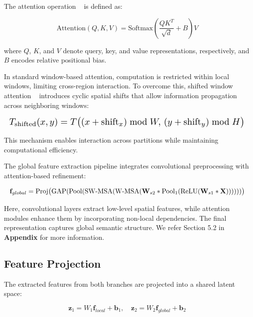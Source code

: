\documentclass[preprint,12pt]{elsarticle}
\begin{document}
The attention operation ~\cite{b4} is defined as:

\begin{equation*}
\text{Attention}(Q,K,V)
=
\text{Softmax}\left(\frac{QK^T}{\sqrt{d}} + B\right)V
\end{equation*}

where $Q$, $K$, and $V$ denote query, key, and value representations, respectively, and $B$ encodes relative positional bias.

In standard window-based attention, computation is restricted within local windows, limiting cross-region interaction. To overcome this, shifted window attention ~\cite{b5} introduces cyclic spatial shifts that allow information propagation across neighboring windows:

\begin{equation*}
\resizebox{\columnwidth}{!}{$
T_{\text{shifted}}(x,y)
=
T\big((x+\text{shift}_x)\bmod W,\,(y+\text{shift}_y)\bmod H\big)
$}
\end{equation*}

This mechanism enables interaction across partitions while maintaining computational efficiency.

The global feature extraction pipeline integrates convolutional preprocessing with attention-based refinement:

\begin{equation*}
\resizebox{\columnwidth}{!}{$
\mathbf{f}_{global}
=
\mathrm{Proj}\big(
\mathrm{GAP}(
\mathrm{Pool}(
\mathrm{SW\text{-}MSA}(
\mathrm{W\text{-}MSA}(
\mathbf{W}_{s2} *
\mathrm{Pool}_1(
\mathrm{ReLU}(\mathbf{W}_{s1} * \mathbf{X})
)
)
)
)
)
\big)
$}
\end{equation*}

Here, convolutional layers extract low-level spatial features, while attention modules enhance them by incorporating non-local dependencies. The final representation captures global semantic structure. We refer Section 5.2 in \textbf{Appendix} for more information.

\subsection{Feature Projection}

The extracted features from both branches are projected into a shared latent space:

\begin{equation*}
\mathbf{z}_1 = W_1 \mathbf{f}_{local} + \mathbf{b}_1,\quad
\mathbf{z}_2 = W_2 \mathbf{f}_{global} + \mathbf{b}_2
\end{equation*}
\end{document}
